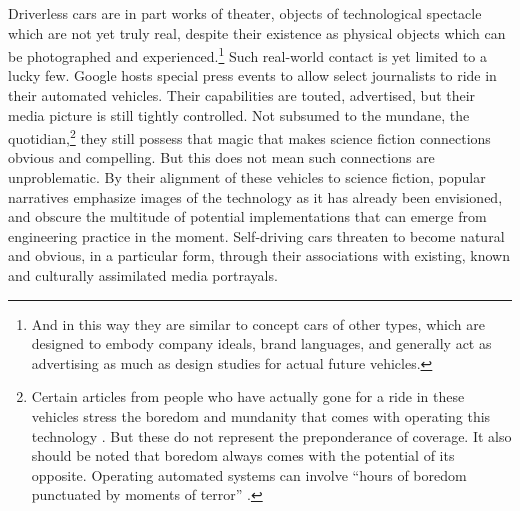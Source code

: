 


Driverless cars
are in part works of theater, objects of technological spectacle which
are not yet truly real, despite their existence as physical objects
which can be photographed and experienced.\footnote{And in this way
  they are similar to concept cars of other types, which are designed
  to embody company ideals, brand languages, and generally act as
  advertising as much as design studies for actual future vehicles.}
Such real-world contact is 
yet limited to a lucky few. Google hosts special press events to allow
select journalists
to ride in their automated vehicles. Their capabilities are touted,
advertised, but their media picture is still tightly controlled. Not subsumed
to the mundane, the quotidian,\footnote{Certain articles from people
  who have actually gone for a ride in these vehicles stress the
  boredom and mundanity that comes with operating this
  technology \cite{rode500}. But these do not represent the
  preponderance of coverage. It also should be noted that boredom
  always comes with the potential of its opposite. Operating automated
systems can involve ``hours of boredom
punctuated by moments of terror'' \cite[p. 339]{sheridan}.} they still
possess that magic that 
makes science fiction connections obvious and compelling. But this
does not mean such connections are unproblematic. By
their alignment of these vehicles to science fiction, popular
narratives emphasize images of the technology as it has already been
envisioned, and obscure the multitude of potential implementations
that can emerge from engineering practice in the moment. Self-driving
cars threaten to become natural and obvious, in a particular form,
through their associations with existing, known and culturally
assimilated media portrayals.

